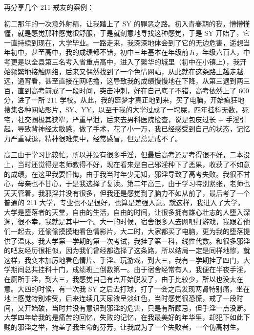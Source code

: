 再分享几个 211 戒友的案例：

\begin{case}[211]\label{108case7}
    初二那年的一次意外射精，让我踏上了 SY 的罪恶之路。初入青春期的我，懵懵懂懂，就是感觉那种感觉很舒服，于是就刻意地寻找这种感觉，于是 SY 开始了，它一直持续到现在，大学毕业。一路走来，我深深地体会到了它的无边危害，遥想当年初中，甚至高中，我的成绩都不错，初中三年基本在年级前五，年级六百人，中考更是以全县第三名考入省重点高中，进入了繁华的城里（初中在小镇上），我开始频繁地接触网络，后来又偶然找到了一个色情网站，从此就在这条路上越走越远，通宵看，甚至直接在网吧撸，这导致我的成绩慢慢地在下降，从第三退到两三百，直到高考前戒了一段时间，突击冲刺，好在自己底子不错，高考依然上了 600 分，进了一所 211 学校。从此，我的噩梦才真正地到来，买了电脑，开始疯狂地搜集各种网站影片，SY、YY，以至于我的大学过成了一坨屎，四年挂科无数，死宅，社交圈极其狭窄，严重早泄，后来去男科医院检查，说是包皮过长 + 手淫引起，导致背神经太敏感，做了手术，花了小一万，我已经感受到自己的状态，记忆力严重减退，精神很难集中，经常感冒，但是总是戒不了。
\end{case}

\begin{case}[211]
    高三由于学习比较忙，所以并没有很多手淫，但最后高考还是考得很不好，二本没上，当时还觉得是老师教得不好，现在看来是自己邪淫种下了恶果，收获了不如意的成绩，在这里我要忏悔，由于我当时年少无知，邪淫导致了高考失败。我很不甘心，母亲也不甘心，于是我选择了复读。第二年高三，由于学习特别紧张，老师也天天管着，我邪淫并没有很多，但我还是感觉到了脑力不如从前了，最后考了一个普通的 211 大学，专业也不是很好，也算是差强人意。就这样，我进入了大学。大学是堕落者的天堂，自由的生活，自由的时间，让很多拥有雄心壮志的人堕入深渊，很不幸，我就是其中一个。大一的时候，宿舍很多人去网吧打游戏，我跟着他们一起去，还偷偷摸摸地看色情影片，大二时，大家都买了电脑，更为我的堕落提供了温床。我大学第一学期的第一次考试，我挂了第一科，线性代数。和很多邪淫的吧友经历很相似，因为我们曾经都选择了这条路，所以结局一定是同样地惨，就这样，我变本加厉地看色情片、手淫、玩游戏，到大三，我有一学期挂了四门，大学期间总共挂科十门，成绩班上倒数第一。由于宿舍经常有人，我便在半夜手淫，在厕所手淫，到大三，我感觉自己有点开始脱发了，由于比较少，所以也没太在意。大四的时候，有一次我 SY 之后去打球，打了一会之后发现两肾特别痛，坐在地上感觉特别难受，后来连续几天尿液呈淡红色，当时感觉很恐慌，戒了一段时间，又开始破，当时并没有意识到邪淫的危害，只是有所顾忌，但手淫一点没断。大学四年给我的是痛苦的回忆，失败的记忆，在我最美好的年华里，却犯下如此下贱的邪淫之举，掩盖了我生命的芬芳，让我成为了一个失败者，一个伪高材生。
\end{case}


